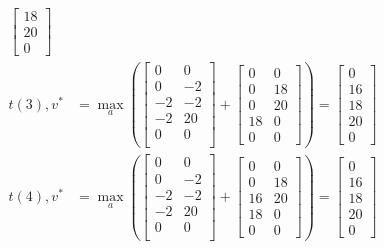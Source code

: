 \begin{align}
\begin{split}
\begin{bmatrix}
            18\\
            20\\
            0
        \end{bmatrix}\\
    t(3) , v^*&=\max\limits_a\left(
        \begin{bmatrix}
            0 & 0 \\
            0 & -2\\
            -2 & -2\\
            -2 & 20\\
            0 & 0\\
        \end{bmatrix}+
        \begin{bmatrix}
            0 & 0\\
            0 & 18\\
            0 & 20\\
            18 & 0\\
            0 & 0
        \end{bmatrix}
        \right)=
        \begin{bmatrix}
            0\\
            16\\
            18\\
            20\\
            0
        \end{bmatrix}\\
        t(4), v^*&=\max\limits_a\left(
        \begin{bmatrix}
            0 & 0 \\
            0 & -2\\
            -2 & -2\\
            -2 & 20\\
            0 & 0\\
        \end{bmatrix}+
        \begin{bmatrix}
            0 & 0\\
            0 & 18\\
            16 & 20\\
            18 & 0\\
            0 & 0
        \end{bmatrix}
        \right)=
        \begin{bmatrix}
            0\\
            16\\
            18\\
            20\\
            0
        \end{bmatrix}
    \end{split}
\end{align}
